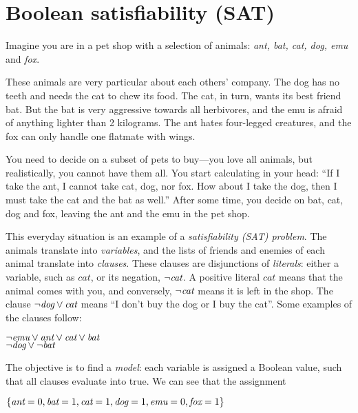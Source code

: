 \def\ant{\text{\em ant}}
\def\bat{\text{\em bat}}
\def\cat{\text{\em cat}}
\def\dog{\text{\em dog}}
\def\emu{\text{\em emu}}
\def\fox{\text{\em fox}}


\section{Boolean satisfiability (SAT)}


Imagine you are in a pet shop with a selection of animals: {\em ant, bat, cat, dog, emu} and {\em fox}.

These animals are very particular about each others' company. The dog has no teeth and needs the cat to chew its food. The cat, in turn, wants its best friend bat. 
But the bat is very aggressive towards all herbivores, and the emu is afraid of anything lighter than 2 kilograms. The ant hates four-legged creatures, and the fox can only handle one flatmate with wings. 

You need to decide on a subset of pets to buy---you love all animals, but realistically, you cannot have them all. You start calculating in your head: ``If I take the ant, I cannot take cat, dog, nor fox. How about I take the dog, then I must take the cat and the bat as well.''
After some time, you decide on bat, cat, dog and fox, leaving the ant and the emu in the pet shop.


This everyday situation is an example of a \emph{satisfiability (SAT) problem}.
The animals translate into \emph{variables}, %
and the lists of friends and enemies of each animal translate into \emph{clauses}.
These clauses are disjunctions of \emph{literals}: either a variable, such as $cat$, or its negation, $\neg{}\cat$.
A positive literal $cat$ means that the animal comes with you, 
and conversely, $\neg{}\cat$ means it is left in the shop. 
The clause $\neg{}\dog \vee \cat$ means ``I don't buy the dog or I buy the cat''. 
Some examples of the clauses follow:

\begin{center}
$\neg{}\emu \vee \ant \vee \cat \vee \bat$ \\
$\neg{}\dog \vee \neg{}\bat$ \\
\end{center}

The objective is to find a \emph{model}: each variable is assigned a Boolean value, such that all clauses evaluate into true. We can see that the assignment 

$\{\ant=0, \bat=1, \cat=1, \dog=1, \emu=0, \fox=1\}$

